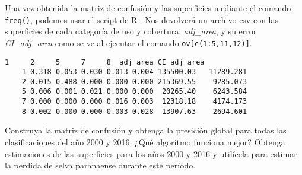 \begin{exa}
  Una vez obtenida la matriz de confusi\'on y las superficies mediante el comando \texttt{freq()}, podemos usar el script de R . Nos devolver\'a un archivo csv con las superficies de cada categor\'ia de uso y cobertura, \emph{adj\_area}, y su error \emph{CI\_adj\_area} como se ve al ejecutar el comando \texttt{ov[c(1:5,11,12)]}.
  \begin{Verbatim}[fontsize=\small]
          1     2     5     7     8  adj_area CI_adj_area
    1 0.318 0.053 0.030 0.013 0.004 135500.03   11289.281
    2 0.015 0.488 0.000 0.000 0.000 215369.55    9285.073
    5 0.006 0.001 0.021 0.000 0.000  20265.40    6243.584
    7 0.000 0.000 0.000 0.016 0.003  12318.18    4174.173
    8 0.002 0.000 0.000 0.003 0.028  13907.63    2694.601
  \end{Verbatim}
\end{exa}


\begin{act}
    Construya la matriz de confusi\'on y obtenga la presici\'on global para todas las clasificaciones del a\~no 2000 y 2016. ¿Qu\'e algor\'itmo funciona mejor? Obtenga estimaciones de las superficies para los a\~nos 2000 y 2016 y util\'icela para estimar la perdida de selva paranaense durante este per\'iodo.
\end{act}
